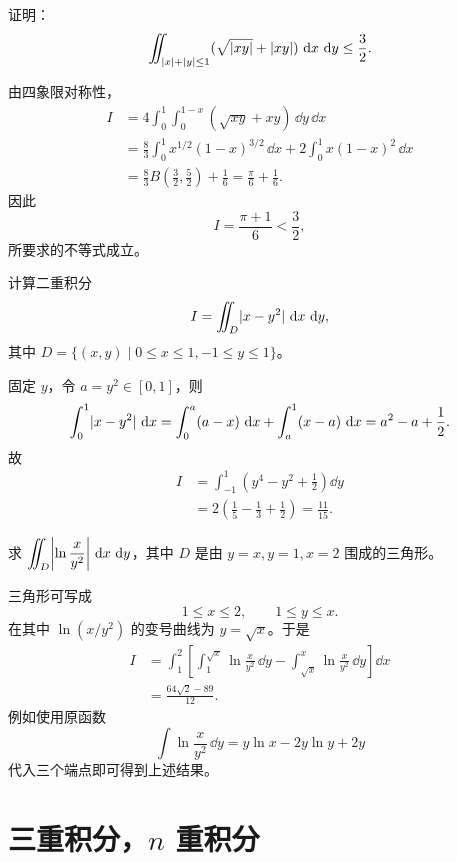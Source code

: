 \begin{xexercise}[15]
证明：
  \[
    \iint_{\lvert x\rvert+\lvert y\rvert\le1}(\sqrt{\lvert xy\rvert}+\lvert xy\rvert)\,\mathop{}\!\mathrm{d} x\,\mathop{}\!\mathrm{d} y\le\frac32.
  \]
\end{xexercise}
\begin{xsolution}
由四象限对称性，
\begin{align*}
 I&=4\int_0^1\int_0^{1-x}(\sqrt{xy}+xy)\,\dd y\,\dd x\\
 &=\frac83\int_0^1x^{1/2}(1-x)^{3/2}\,\dd x
 +2\int_0^1x(1-x)^2\,\dd x\\
 &=\frac83B\left(\frac32,\frac52\right)+\frac16
 =\frac\pi6+\frac16.
\end{align*}
因此
\[
 I=\frac{\pi+1}{6}<\frac32,
\]
所要求的不等式成立。
\end{xsolution}


\begin{xexercise}[16]
计算二重积分
  \[
    I=\iint_D\lvert x-y^2\rvert\,\mathop{}\!\mathrm{d} x\,\mathop{}\!\mathrm{d} y,
  \]
  其中 $D=\{(x,y)\mid0\le x\le1,-1\le y\le1\}$。
\end{xexercise}
\begin{xsolution}
固定 $y$，令 $a=y^2\in[0,1]$，则
\[
 \int_0^1\lvert x-y^2\rvert\,\mathop{}\!\mathrm{d} x
 =\int_0^a(a-x)\,\mathop{}\!\mathrm{d} x+\int_a^1(x-a)\,\mathop{}\!\mathrm{d} x
 =a^2-a+\frac12.
\]
故
\begin{align*}
 I&=\int_{-1}^1\left(y^4-y^2+\frac12\right)\dd y\\
 &=2\left(\frac15-\frac13+\frac12\right)
 =\boxed{\frac{11}{15}}.
\end{align*}
\end{xsolution}


\begin{xexercise}[17]
求 $\displaystyle\iint_D\abs*{\ln\frac{x}{y^2}}\,\dd x\,\dd y$，其中 $D$ 是由 $y=x,y=1,x=2$ 围成的三角形。
\end{xexercise}
\begin{xsolution}
三角形可写成
\[
 1\le x\le2,
 \qquad1\le y\le x.
\]
在其中 $\ln(x/y^2)$ 的变号曲线为 $y=\sqrt x$。于是
\begin{align*}
 I&=\int_1^2\left[
 \int_1^{\sqrt x}\ln\frac{x}{y^2}\,\dd y
 -\int_{\sqrt x}^{x}\ln\frac{x}{y^2}\,\dd y
 \right]\dd x\\
 &=\boxed{\frac{64\sqrt2-89}{12}}.
\end{align*}
例如使用原函数
\[
 \int\ln\frac{x}{y^2}\,\dd y
 =y\ln x-2y\ln y+2y
\]
代入三个端点即可得到上述结果。
\end{xsolution}


\section{\texorpdfstring{三重积分，$n$ 重积分}{三重积分，n 重积分}}

